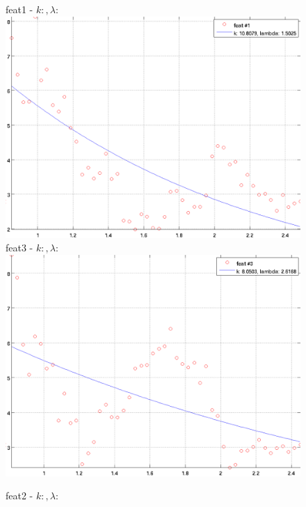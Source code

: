 \documentclass[12pt]{report}
\begin{document}
\newcommand{\imFeat}{.4}
\begin{figure}[H]
\begin{minipage}[t]{0.5\linewidth}
	\centering
	feat1 - $k: , \lambda:  $\\
	\includegraphics[scale=\imFeat]{images/feat1}\\
	feat3 - $k: , \lambda:  $\\
	\includegraphics[scale=\imFeat]{images/feat3}\\
\end{minipage}
\begin{minipage}[t]{0.5\linewidth}
	\centering
	feat2 - $k: , \lambda:  $\\

\end{minipage}
\end{figure}
\end{document}
